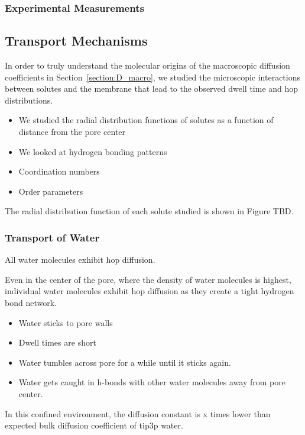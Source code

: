 \documentclass{article}
\begin{document}
  \subsubsection{Experimental Measurements}


  \subsection{Transport Mechanisms}

  In order to truly understand the molecular origins of the macroscopic
  diffusion coefficients in Section~\ref{section:D_macro}, we studied the
  microscopic interactions between solutes and the membrane that lead to the
  observed dwell time and hop distributions.
  \begin{itemize}
	\item We studied the radial distribution functions of solutes as a
	function of distance from the pore center
	\item We looked at hydrogen bonding patterns
	\item Coordination numbers
	\item Order parameters
  \end{itemize}

  The radial distribution function of each solute studied is shown in 
  Figure TBD.

  \subsubsection*{Transport of Water}

  All water molecules exhibit hop diffusion.

  Even in the center of the pore, where the density of water molecules is
  highest, individual water molecules exhibit hop diffusion as they create a
  tight hydrogen bond network.
  \begin{itemize}
	\item Water sticks to pore walls
	\item Dwell times are short
	\item Water tumbles across pore for a while until it sticks again. 
	\item Water gets caught in h-bonds with other water molecules away
	from pore center.
  \end{itemize}

  In this confined environment, the diffusion constant is x times lower than
  expected bulk diffusion coefficient of tip3p water.
\end{document}
